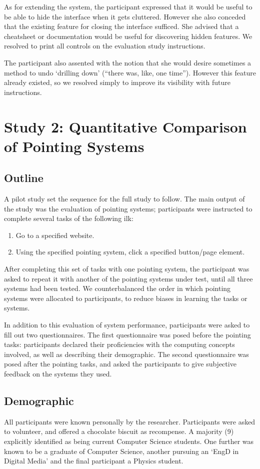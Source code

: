 \documentclass[11pt,openright,a4paper]{report}
\begin{document}
As for extending the system, the participant expressed that it would be useful to be able to hide the interface when it gets cluttered. However she also conceded that the existing feature for closing the interface sufficed. She advised that a cheatsheet or documentation would be useful for discovering hidden features. We resolved to print all controls on the evaluation study instructions.

The participant also assented with the notion that she would desire sometimes a method to undo `drilling down' (``there was, like, one time''). However this feature already existed, so we resolved simply to improve its visibility with future instructions.

\section{Study 2: Quantitative Comparison of Pointing Systems}
\subsection{Outline}
A pilot study set the sequence for the full study to follow. The main output of the study was the evaluation of pointing systems; participants were instructed to complete several tasks of the following ilk:
\begin{enumerate}
\item Go to a specified website.
\item Using the specified pointing system, click a specified button/page element.
\end{enumerate}
After completing this set of tasks with one pointing system, the participant was asked to repeat it with another of the pointing systems under test, until all three systems had been tested. We counterbalanced the order in which pointing systems were allocated to participants, to reduce biases in learning the tasks or systems.

In addition to this evaluation of system performance, participants were asked to fill out two questionnaires. The first questionnaire was posed before the pointing tasks: participants declared their proficiencies with the computing concepts involved, as well as describing their demographic. The second questionnaire was posed after the pointing tasks, and asked the participants to give subjective feedback on the systems they used.

\subsection{Demographic}
All participants were known personally by the researcher. Participants were asked to volunteer, and offered a chocolate biscuit as recompense. A majority (9) explicitly identified as being current Computer Science students. One further was known to be a graduate of Computer Science, another pursuing an `EngD in Digital Media' and the final participant a Physics student.
\end{document}

